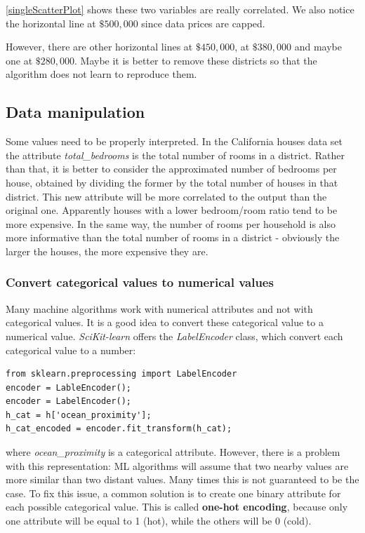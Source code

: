 \documentclass[12pt, letterpaper]{article}
\theoremstyle{definition}
\let\ti\textit
\let\tb\textbf
\begin{document}
\ref{singleScatterPlot} shows these two variables are really correlated. We also notice the horizontal line at $\$500,000$ since data prices are capped.

However, there are other horizontal lines at $\$450,000$, at $\$380,000$ and maybe one at $\$280,000$. Maybe it is better to remove these districts so that the algorithm does not learn to reproduce them.

\subsection{Data manipulation}
Some values need to be properly interpreted. In the California houses data set the attribute \ti{total\_bedrooms} is the total number of rooms in a district. Rather than that, it is better to consider the approximated number of bedrooms per house, obtained by dividing the former by the total number of houses in that district. This new attribute will be more correlated to the output than the original one. Apparently houses with a lower bedroom/room ratio tend to be more expensive. 
In the same way, the number of rooms per household is also more informative than the total number of rooms in a district - obviously the larger the houses, the more expensive they are.

\subsubsection{Convert categorical values to numerical values}
Many machine algorithms work with numerical attributes and not with categorical values. It is a good idea to convert these categorical value to a numerical value. \ti{SciKit-learn} offers the \ti{LabelEncoder} class, which convert each categorical value to a number:
\begin{lstlisting}[caption=Example of usage of \ti{LabelEncoder} class]
from sklearn.preprocessing import LabelEncoder
encoder = LableEncoder();
encoder = LabelEncoder();
h_cat = h['ocean_proximity'];
h_cat_encoded = encoder.fit_transform(h_cat);
\end{lstlisting}
where \ti{ocean\_proximity} is a categorical attribute. However, there is a problem with this representation:  ML algorithms will assume that two nearby values are more similar than two distant values. Many times this is not guaranteed to be the case. To fix this issue, a common solution is to create one binary attribute for each possible categorical value. This is called \tb{one-hot encoding}, because only one attribute will be equal to 1 (hot), while the others will be 0 (cold).
\end{document}
